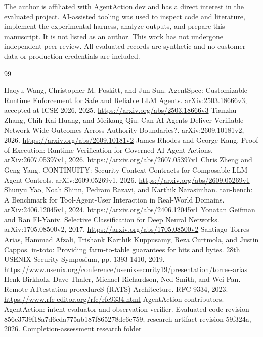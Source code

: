 \documentclass[11pt]{article}
\begin{document}
The author is affiliated with AgentAction.dev and has a direct interest in the evaluated project. AI-assisted tooling was used to inspect code and literature, implement the experimental harness, analyze outputs, and prepare this manuscript. It is not listed as an author. This work has not undergone independent peer review. All evaluated records are synthetic and no customer data or production credentials are included.

\clearpage\begin{thebibliography}{99}\raggedright
{} Haoyu Wang, Christopher M. Poskitt, and Jun Sun. AgentSpec: Customizable Runtime Enforcement for Safe and Reliable LLM Agents. arXiv:2503.18666v3; accepted at ICSE 2026, 2025. \url{https://arxiv.org/abs/2503.18666v3}
 Tianzhu Zhang, Chih-Kai Huang, and Meikang Qiu. Can AI Agents Deliver Verifiable Network-Wide Outcomes Across Authority Boundaries?. arXiv:2609.10181v2, 2026. \url{https://arxiv.org/abs/2609.10181v2}
 James Rhodes and George Kang. Proof of Execution: Runtime Verification for Governed AI Agent Actions. arXiv:2607.05397v1, 2026. \url{https://arxiv.org/abs/2607.05397v1}
 Chris Zheng and Geng Yang. CONTINUITY: Security-Context Contracts for Composable LLM Agent Controls. arXiv:2609.05269v1, 2026. \url{https://arxiv.org/abs/2609.05269v1}
 Shunyu Yao, Noah Shinn, Pedram Razavi, and Karthik Narasimhan. tau-bench: A Benchmark for Tool-Agent-User Interaction in Real-World Domains. arXiv:2406.12045v1, 2024. \url{https://arxiv.org/abs/2406.12045v1}
 Yonatan Geifman and Ran El-Yaniv. Selective Classification for Deep Neural Networks. arXiv:1705.08500v2, 2017. \url{https://arxiv.org/abs/1705.08500v2}
 Santiago Torres-Arias, Hammad Afzali, Trishank Karthik Kuppusamy, Reza Curtmola, and Justin Cappos. in-toto: Providing farm-to-table guarantees for bits and bytes. 28th USENIX Security Symposium, pp. 1393-1410, 2019. \url{https://www.usenix.org/conference/usenixsecurity19/presentation/torres-arias}
 Henk Birkholz, Dave Thaler, Michael Richardson, Ned Smith, and Wei Pan. Remote ATtestation procedureS (RATS) Architecture. RFC 9334, 2023. \url{https://www.rfc-editor.org/rfc/rfc9334.html}
 AgentAction contributors. AgentAction: intent evaluator and observation verifier. Evaluated code revision 856c3739f18a7d6cda775ab187f865278dc6e759; research artifact revision 59f324a, 2026. \href{https://github.com/dinpd/AgentAction/tree/59f324a33fe2fd04ae167e5bbd4cac0330c65c9e/research/completion-assessment}{Completion-assessment research folder}

\end{thebibliography}
\end{document}
